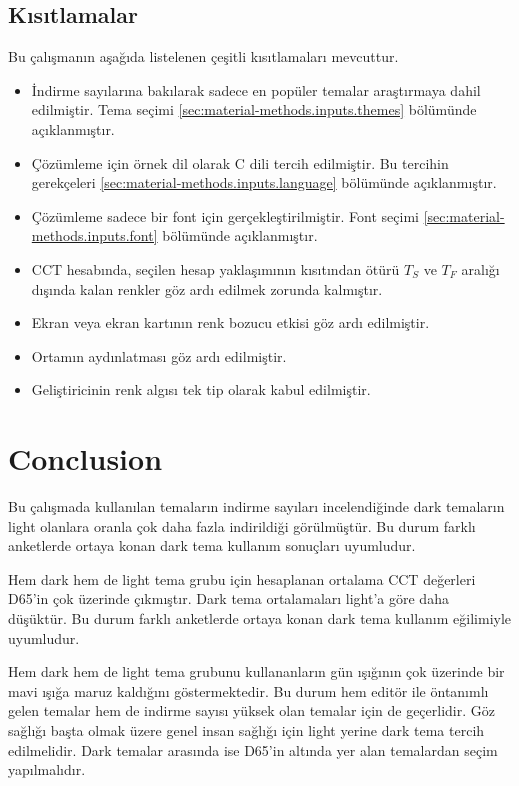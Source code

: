 \documentclass{article}
\begin{document}
\subsection{Kısıtlamalar}

Bu çalışmanın aşağıda listelenen çeşitli kısıtlamaları mevcuttur.

\begin{itemize}
  \item İndirme sayılarına bakılarak sadece en popüler temalar araştırmaya dahil edilmiştir.  Tema seçimi
    \ref{sec:material-methods.inputs.themes} bölümünde açıklanmıştır.

  \item Çözümleme için örnek dil olarak C dili tercih edilmiştir.  Bu tercihin gerekçeleri
    \ref{sec:material-methods.inputs.language} bölümünde açıklanmıştır.

  \item Çözümleme sadece bir font için gerçekleştirilmiştir.  Font seçimi \ref{sec:material-methods.inputs.font}
    bölümünde açıklanmıştır.

  \item CCT hesabında, seçilen hesap yaklaşımının kısıtından ötürü $T_S$ ve $T_F$ aralığı dışında kalan renkler göz ardı
    edilmek zorunda kalmıştır.

	\item Ekran veya ekran kartının renk bozucu etkisi göz ardı edilmiştir.

	\item Ortamın aydınlatması göz ardı edilmiştir.

	\item Geliştiricinin renk algısı tek tip olarak kabul edilmiştir.
\end{itemize}

\section{Conclusion}
Bu çalışmada kullanılan temaların indirme sayıları incelendiğinde dark temaların light olanlara oranla çok daha fazla indirildiği görülmüştür. Bu durum farklı anketlerde ortaya konan dark tema kullanım sonuçları uyumludur.

Hem dark hem de light tema grubu için hesaplanan ortalama CCT değerleri D65'in çok üzerinde çıkmıştır. Dark tema ortalamaları light'a göre daha düşüktür. Bu durum farklı anketlerde ortaya konan dark tema kullanım eğilimiyle uyumludur.

Hem dark hem de light tema grubunu kullananların gün ışığının çok üzerinde bir mavi ışığa maruz kaldığını göstermektedir. Bu durum hem editör ile öntanımlı gelen temalar hem de indirme sayısı yüksek olan temalar için de geçerlidir. Göz sağlığı başta olmak üzere genel insan sağlığı için light yerine dark tema tercih edilmelidir. Dark temalar arasında ise D65'in altında yer alan temalardan seçim yapılmalıdır.
\end{document}
